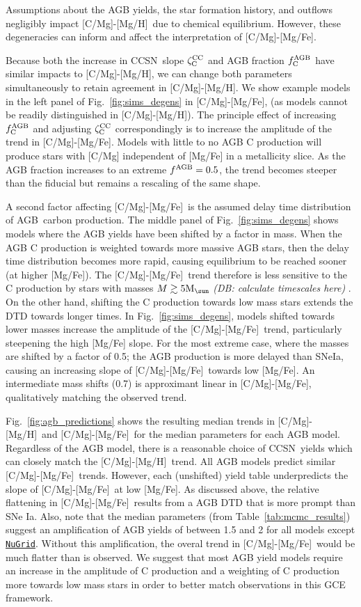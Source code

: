 \documentclass[fleqn,
referee, %
usenatbib]{mnras}
\newcommand{\nugrid}{\texttt{\hyperlink{nugrid}{NuGrid}}}
\newcommand{\agb}{AGB}
\newcommand{\cc}{CCSN}
\newcommand{\caah}{[C/Mg]-[Mg/H]}
\newcommand{\caafe}{[C/Mg]-[Mg/Fe]}
\newcommand{\zcc}{\zeta_{\rm C}^{\rm CC}}
\newcommand{\fagb}{f_{\rm C}^{\rm AGB}}
\newcommand{\Mo}{ {\rm M}_{\sun}}
\newcommand{\dbnote}[1]{ {\color{Thistle} \textit{\small (DB: #1)}} }
\begin{document}
Assumptions about the AGB yields, the star formation history, and outflows negligibly impact \caah\ due to chemical equilibrium. However, these degeneracies can inform and affect the interpretation of \caafe. 

Because both the increase in \cc\ slope $\zcc$ and AGB fraction $\fagb$ have similar impacts to \caah, we can change both parameters simultaneously to retain agreement in \caah. We show example models in the left panel of Fig.~\ref{fig:sims_degens} in \caafe, (as models cannot be readily distinguished in \caah). The principle effect of increasing $\fagb$ and adjusting $\zcc$ correspondingly is to increase the amplitude of the trend in \caafe. Models with little to no AGB C production will produce stars with [C/Mg] independent of [Mg/Fe] in a metallicity slice. As the AGB fraction increases to an extreme $f^{\rm AGB}=0.5$, the trend becomes steeper than the fiducial but remains a rescaling of the same shape. 


A second factor affecting \caafe\ is the assumed delay time distribution of \agb\ carbon production.
The middle panel of Fig.~\ref{fig:sims_degens} shows models where the AGB yields have been shifted by a factor in mass. When the AGB C production is weighted towards more massive AGB stars, then the delay time distribution becomes more rapid, causing equilibrium to be reached sooner (at higher [Mg/Fe]). The \caafe\ trend therefore is less sensitive to the C production by stars with masses $M \gtrsim 5 \Mo$ \dbnote{calculate timescales here}. On the other hand, shifting the C production towards low mass stars extends the DTD towards longer times. In Fig.~\ref{fig:sims_degens}, models shifted towards lower masses increase the amplitude of the \caafe\ trend, particularly steepening the high [Mg/Fe] slope. For the most extreme case, where the masses are shifted by a factor of 0.5; the AGB production is more delayed than SNeIa, causing an increasing slope of \caafe\ towards low [Mg/Fe]. An intermediate mass shifts (0.7) is approximant linear in \caafe, qualitatively matching the observed trend. 

Fig.~\ref{fig:agb_predictions} shows the resulting median trends in \caah\ and \caafe\ for the median parameters for each AGB model. Regardless of the AGB model, there is a reasonable choice of \cc\ yields which can closely match the \caah\ trend. All AGB models predict similar \caafe\ trends. However, each (unshifted) yield table underpredicts the slope of \caafe\ at low [Mg/Fe]. As discussed above, the relative flattening in \caafe\ results from a AGB DTD that is more prompt than SNe Ia.
Also, note that the median parameters (from Table~\ref{tab:mcmc_results}) suggest an amplification of AGB yields of between 1.5 and 2 for all models except \nugrid. Without this amplification, the overal trend in \caafe\ would be much flatter than is observed. 
We suggest that most AGB yield models require an increase in the amplitude of C production and a weighting of C production more towards low mass stars in order to better match observations in this GCE framework.
\end{document}
